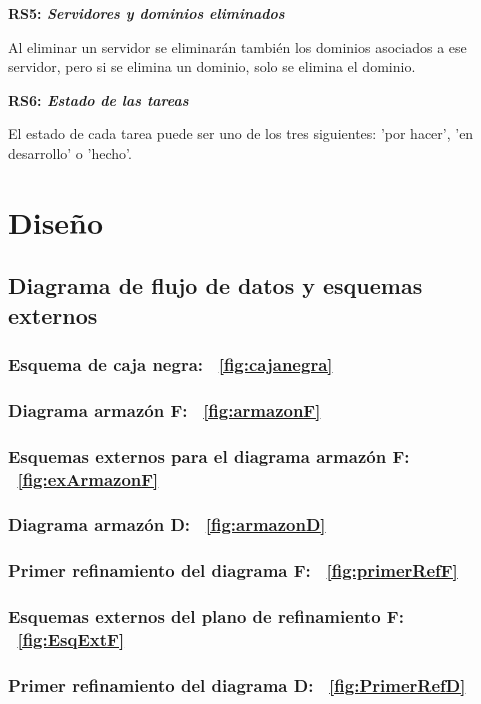 \documentclass[paper=a4, fontsize=11pt, spanish]{scrartcl}
\begin{document}
\setlength{\parindent}{0em}
\textbf{RS5: \textit{Servidores y dominios eliminados}}
\setlength{\parindent}{2em}

Al eliminar un servidor se eliminarán también los dominios asociados a ese servidor, pero si se elimina un dominio, solo se elimina el dominio.

\setlength{\parindent}{0em}
\textbf{RS6: \textit{Estado de las tareas}}
\setlength{\parindent}{2em}

El estado de cada tarea puede ser uno de los tres siguientes: 'por hacer', 'en desarrollo' o 'hecho'.

\section{Diseño}
\subsection{Diagrama de flujo de datos y esquemas externos}
\subsubsection* {Esquema de caja negra: ~\ref{fig:cajanegra}}
\subsubsection* {Diagrama armazón F: ~\ref{fig:armazonF}}
\subsubsection* {Esquemas externos para el diagrama armazón F: ~\ref{fig:exArmazonF}}
\subsubsection* {Diagrama armazón D: ~\ref{fig:armazonD}}
\subsubsection* {Primer refinamiento del diagrama F: ~\ref{fig:primerRefF}}
\subsubsection* {Esquemas externos del plano de refinamiento F: ~\ref{fig:EsqExtF}}
\subsubsection* {Primer refinamiento del diagrama D: ~\ref{fig:PrimerRefD}}
\end{document}
